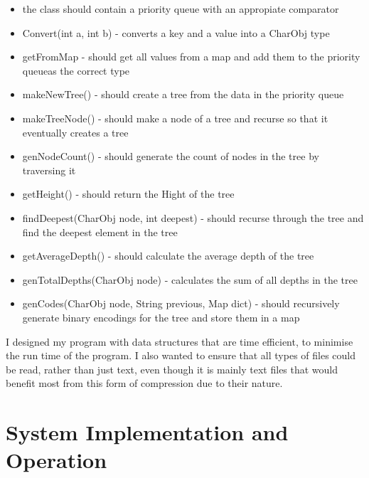 \documentclass[11pt, oneside]{amsart}
\begin{document}
\begin{itemize}
\begin{itemize}
			\item the class should contain a priority queue with an appropiate comparator
			\item Convert(int a, int b) - converts a key and a value into a CharObj type
			\item getFromMap - should get all values from a map and add them to the priority queueas the correct type
			\item makeNewTree() - should create a tree from the data in the priority queue
			\item makeTreeNode() - should make a node of a tree and recurse so that it eventually creates a tree
			\item genNodeCount() - should generate the count of nodes in the tree by traversing it
			\item getHeight() - should return the Hight of the tree
			\item findDeepest(CharObj node, int deepest) - should recurse through the tree and find the deepest element in the tree
			\item getAverageDepth() - should calculate the average depth of the tree
			\item genTotalDepths(CharObj node) - calculates the sum of all depths in the tree
			\item genCodes(CharObj node, String previous, Map dict) - should recursively generate binary encodings for the tree and store them in a map
		\end{itemize}
	\end{itemize}
	I designed my program with data structures that are time efficient, to minimise the run time of the program. I also wanted to ensure that all types of files could be read, rather than just text, even though it is mainly text files that would benefit most from this form of compression due to their nature.
\section{System Implementation and Operation}
\end{document}
